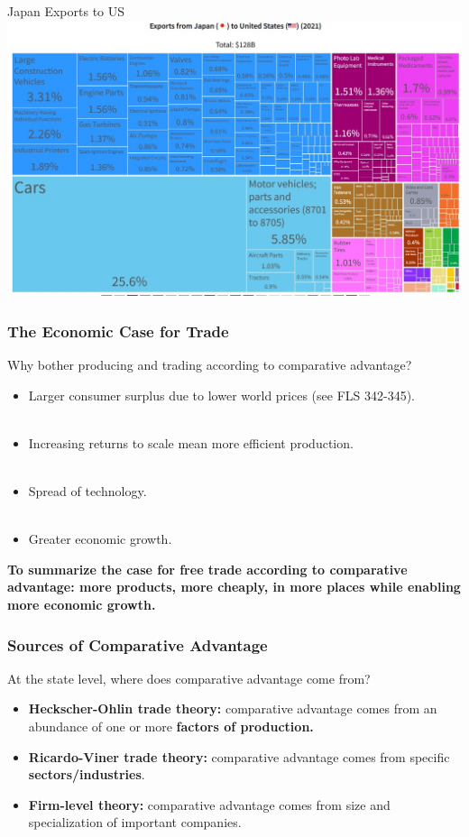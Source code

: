\documentclass[handout]{beamer}
\begin{document}
\begin{frame}{\LARGE Japan Exports to US}
    \centering
\includegraphics[width=\textwidth,height=0.9\textheight,keepaspectratio]{Japan to US.JPG}
\end{frame}

\begin{frame} 
\frametitle{\LARGE{The Economic Case for Trade}}
Why bother producing and trading according to comparative advantage?
    \begin{itemize}
        \item Larger consumer surplus due to lower world prices (see FLS 342-345). \pause 
        \\~\\
        \item Increasing returns to scale mean more efficient production. \pause 
        \\~\\
        \item Spread of technology. \pause 
        \\~\\ 
        \item Greater economic growth. \pause
    \end{itemize}
\textbf{To summarize the case for free trade according to comparative advantage: more products, more cheaply, in more places while enabling more economic growth.}
\end{frame}

\begin{frame} 
	\frametitle{\LARGE{Sources of Comparative Advantage}}
At the state level, where does comparative advantage come from?
	\begin{itemize}
			\item \textbf{Heckscher-Ohlin trade theory:} comparative advantage comes from an abundance of one or more \textbf{factors of production.} \pause 
			\item \textbf{Ricardo-Viner trade theory:} comparative advantage comes from specific \textbf{sectors/industries}. \pause 
			\item \textbf{Firm-level theory:} comparative advantage comes from size and specialization of important companies.
	\end{itemize}
\end{frame}
\end{document}

